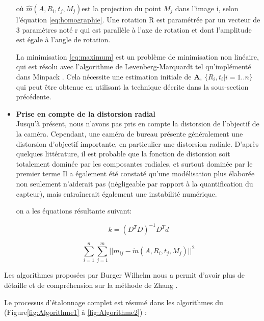 \begin{itemize}[label={\Huge$\star$}]
 où $\hat{m}(A,R_{i},t_{j},M_{j})$est la projection du point $M_{j}$  dans l'image i, selon l'équation \ref{eq:homographie}. Une rotation R est paramétrée par un vecteur de 3 paramètres noté r qui est parallèle à l'axe de rotation et dont l'amplitude est égale à l'angle de rotation.  
 
 La minimisation  \ref{eq:maximum} est un problème de minimisation non 
 linéaire, qui est résolu avec l'algorithme de Levenberg-Marquardt tel 
 qu'implémenté dans Minpack \cite{watson_levenberg-marquardt_1978}. Cela nécessite une estimation initiale 
 de \textbf{A}, $\{R_i, t_i|i = 1..n\}$ qui peut être obtenue en utilisant la technique 
 décrite dans la sous-section précédente.\\
 
 \item \textbf{Prise en compte de la distorsion radial}
 \\
 
 Jusqu’à présent, nous n’avons pas pris en compte la distorsion de l’objectif 
  de la caméra. Cependant, une caméra de bureau présente généralement 
 une distorsion d'objectif importante, en particulier une distorsion radiale. 
  D'après quelques littérature, il est probable que la fonction de distorsion soit totalement dominée par les 
 composantes radiales, et surtout dominée par le premier terme Il a également été constaté qu'une modélisation plus élaborée non seulement n'aiderait pas (négligeable par rapport à la quantification du 
 capteur), mais entraînerait également une instabilité numérique.
 
 on a les équations résultante suivant:
 
 \begin{equation}
 	k
 	=
 	(D^{T}D)^{-1}D^{T}d
 	\label{eq:radial}
 \end{equation}	
 	
 	\begin{equation}
 		\sum_{i=1}^{n} \sum_{j=1}^{m} 
 		||m_{ij}-\mathring{m}
 		(A,R_{i},t_{j},M_{j})||^{2}
 		\label{eq:radial2}
 	\end{equation}
 	
 \end{itemize} 
 
 Les algorithmes proposées par Burger Wilhelm nous a permit d'avoir plus de détaille et de compréhension sur la méthode de Zhang \cite{burger_zhangs_2016}.
 
 Le processus d’étalonnage complet est résumé dans les algorithmes du (Figure\ref{fig:Algorithme1} à \ref{fig:Algorithme2}) :
 
